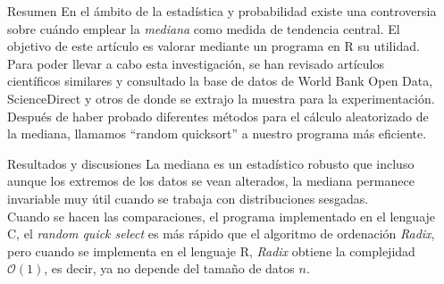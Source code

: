 \documentclass[final]{beamer}
\newlength{\sepwid}
\newlength{\onecolwid}
\begin{document}
\begin{frame}[t]
\begin{columns}[t]
		\begin{column}{\sepwid}\end{column}

		\begin{column}{\onecolwid} %

			\begin{block}{Resumen}
				En el ámbito de la estadística y probabilidad existe una controversia sobre cuándo emplear la \emph{mediana} como medida de tendencia central. El objetivo de este artículo es valorar mediante un programa en R su utilidad. Para poder llevar a cabo esta investigación, se han revisado artículos científicos similares y consultado la base de datos de World Bank Open Data, ScienceDirect y otros de donde se extrajo la muestra para la experimentación.\\[0.5\baselineskip]
				Después de haber probado diferentes métodos para el cálculo aleatorizado de la mediana, llamamos ``random quicksort'' a nuestro programa más eficiente.
			\end{block}
			\vspace{-0.5cm}

			\begin{block}{Resultados y discusiones}
				La mediana es un estadístico robusto que incluso aunque los extremos de los datos se vean alterados, la mediana permanece invariable muy útil cuando se trabaja con distribuciones sesgadas.\\[0.5\baselineskip]
				Cuando se hacen las comparaciones, el programa implementado en el lenguaje C, el \emph{random quick select} es más rápido que el algoritmo de ordenación \emph{Radix}, pero cuando se implementa en el lenguaje R, \emph{Radix} obtiene la complejidad $\mathcal{O}(1)$, es decir, ya no depende del tamaño de datos $n$.
			\end{block}
			\vspace{-0.8cm}


\end{column}
\end{columns}
\end{frame}
\end{document}
